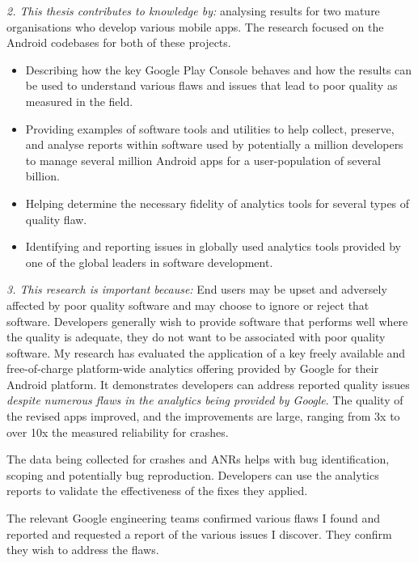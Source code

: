 \vspace{3mm}
\emph{2. This thesis contributes to knowledge by: }
analysing results for two mature organisations who develop various mobile apps. The research focused on the Android codebases for both of these projects. 

\begin{itemize}
    \item Describing how the key Google Play Console behaves and how the results can be used to understand various flaws and issues that lead to poor quality as measured in the field.

    \item Providing examples of software tools and utilities to help collect, preserve, and analyse reports within software used by potentially a million developers to manage several million Android apps for a user-population of several billion.

    \item Helping determine the necessary fidelity of analytics tools for several types of quality flaw. 

    \item Identifying and reporting issues in globally used analytics tools provided by one of the global leaders in software development.  
\end{itemize}
\vspace{3mm}
\emph{3. This research is important because: }
End users may be upset and adversely affected by poor quality software and may choose to ignore or reject that software. Developers generally wish to provide software that performs well where the quality is adequate, they do not want to be associated with poor quality software. My research has evaluated the application of a key freely available and free-of-charge platform-wide analytics offering provided by Google for their Android platform. It demonstrates developers can address reported quality issues \emph{despite numerous flaws in the analytics being provided by Google}. The quality of the revised apps improved, and the improvements are large, ranging from 3x to over 10x the measured reliability for crashes.

The data being collected for crashes and ANRs helps with bug identification, scoping and potentially bug reproduction. Developers can use the analytics reports to validate the effectiveness of the fixes they applied.

The relevant Google engineering teams confirmed various flaws I found and reported and requested a report of the various issues I discover. They confirm they wish to address the flaws.  

